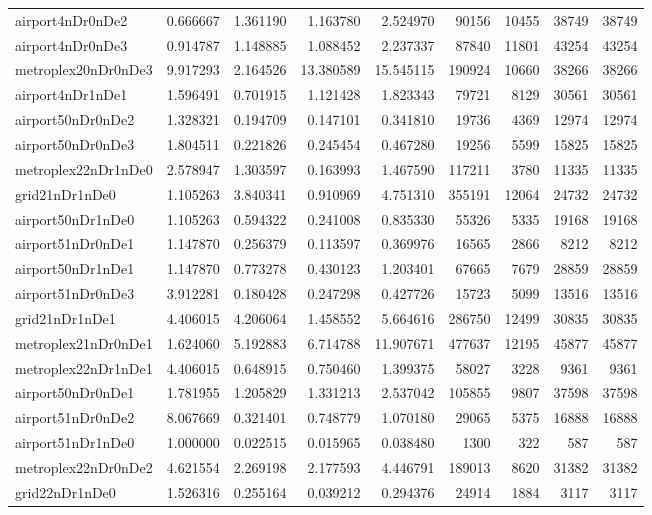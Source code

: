 \begin{longtable}{|l|r|r|r|r|r|r|r|r|}
airport4nDr0nDe2 & 0.666667 & 1.361190 & 1.163780 & 2.524970 & 90156 & 10455 & 38749 & 38749 \\
airport4nDr0nDe3 & 0.914787 & 1.148885 & 1.088452 & 2.237337 & 87840 & 11801 & 43254 & 43254 \\
metroplex20nDr0nDe3 & 9.917293 & 2.164526 & 13.380589 & 15.545115 & 190924 & 10660 & 38266 & 38266 \\
airport4nDr1nDe1 & 1.596491 & 0.701915 & 1.121428 & 1.823343 & 79721 & 8129 & 30561 & 30561 \\
airport50nDr0nDe2 & 1.328321 & 0.194709 & 0.147101 & 0.341810 & 19736 & 4369 & 12974 & 12974 \\
airport50nDr0nDe3 & 1.804511 & 0.221826 & 0.245454 & 0.467280 & 19256 & 5599 & 15825 & 15825 \\
metroplex22nDr1nDe0 & 2.578947 & 1.303597 & 0.163993 & 1.467590 & 117211 & 3780 & 11335 & 11335 \\
grid21nDr1nDe0 & 1.105263 & 3.840341 & 0.910969 & 4.751310 & 355191 & 12064 & 24732 & 24732 \\
airport50nDr1nDe0 & 1.105263 & 0.594322 & 0.241008 & 0.835330 & 55326 & 5335 & 19168 & 19168 \\
airport51nDr0nDe1 & 1.147870 & 0.256379 & 0.113597 & 0.369976 & 16565 & 2866 & 8212 & 8212 \\
airport50nDr1nDe1 & 1.147870 & 0.773278 & 0.430123 & 1.203401 & 67665 & 7679 & 28859 & 28859 \\
airport51nDr0nDe3 & 3.912281 & 0.180428 & 0.247298 & 0.427726 & 15723 & 5099 & 13516 & 13516 \\
grid21nDr1nDe1 & 4.406015 & 4.206064 & 1.458552 & 5.664616 & 286750 & 12499 & 30835 & 30835 \\
metroplex21nDr0nDe1 & 1.624060 & 5.192883 & 6.714788 & 11.907671 & 477637 & 12195 & 45877 & 45877 \\
metroplex22nDr1nDe1 & 4.406015 & 0.648915 & 0.750460 & 1.399375 & 58027 & 3228 & 9361 & 9361 \\
airport50nDr0nDe1 & 1.781955 & 1.205829 & 1.331213 & 2.537042 & 105855 & 9807 & 37598 & 37598 \\
airport51nDr0nDe2 & 8.067669 & 0.321401 & 0.748779 & 1.070180 & 29065 & 5375 & 16888 & 16888 \\
airport51nDr1nDe0 & 1.000000 & 0.022515 & 0.015965 & 0.038480 & 1300 & 322 & 587 & 587 \\
metroplex22nDr0nDe2 & 4.621554 & 2.269198 & 2.177593 & 4.446791 & 189013 & 8620 & 31382 & 31382 \\
grid22nDr1nDe0 & 1.526316 & 0.255164 & 0.039212 & 0.294376 & 24914 & 1884 & 3117 & 3117 \\

\end{longtable}
